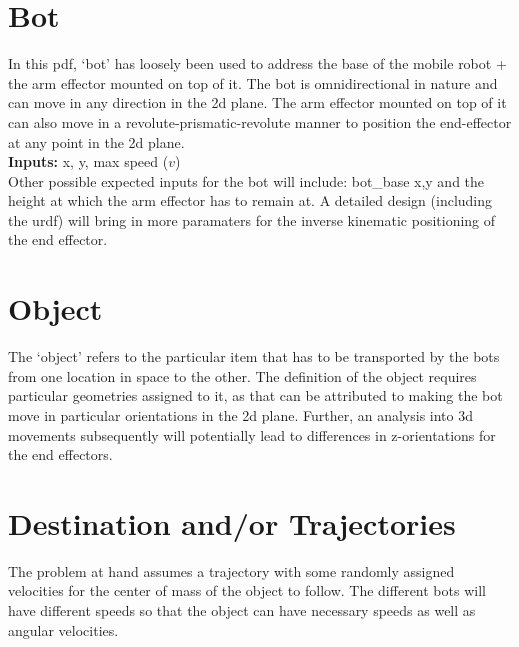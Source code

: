 \documentclass[12pt,english]{report}
\begin{document}
\section{Bot}
In this pdf, `bot' has loosely been used to address the base of the mobile robot + the arm effector mounted on top of it. The bot is omnidirectional in nature and can move in any direction in the 2d plane. The arm effector mounted on top of it can also move in a revolute-prismatic-revolute manner to position the end-effector at any point in the 2d plane.\\
\textbf{Inputs:} x, y, max speed ($v$)\\
Other possible expected inputs for the bot will include: bot\_base x,y and the height at which the arm effector has to remain at. A detailed design (including the urdf) will bring in more paramaters for the inverse kinematic positioning of the end effector.
\section{Object}
The `object' refers to the particular item that has to be transported by the bots from one location in space to the other. The definition of the object requires particular geometries assigned to it, as that can be attributed to making the bot move in particular orientations in the 2d plane. Further, an analysis into 3d movements subsequently will potentially lead to differences in z-orientations for the end effectors.
\section{Destination and/or Trajectories}
The problem at hand assumes a trajectory with some randomly assigned velocities for the center of mass of the object to follow. The different bots will have different speeds so that the object can have necessary speeds as well as angular velocities.
\end{document}
